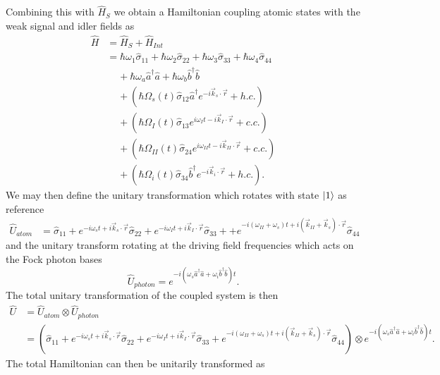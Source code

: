 \documentclass[aps,pra,showpacs,amsmath,amssymb,nofootinbib,longbibliography,superscriptaddress
]{revtex4-1}
\DeclarePairedDelimiter\ket{\lvert}{\rangle}
\theoremstyle{definition}
\theoremstyle{remark}
\newcommand{\0}{\hat{0}}
\begin{document}
Combining this with $\hat{H}_S$ we obtain a Hamiltonian coupling atomic states with the weak signal and idler fields as
\begin{align}
    \hat{H} &= \hat{H}_S + \hat{H}_{Int} \nonumber\\
    &= \hbar \omega_1 \hat{\sigma}_{11} + \hbar \omega_2 \hat{\sigma}_{22} + \hbar \omega_3 \hat{\sigma}_{33} + \hbar \omega_4 \hat{\sigma}_{44}\nonumber \\
    &\;\;\;\;+ \hbar \omega_{a} \hat{a}^{\dagger} \hat{a} + \hbar \omega_{b} \hat{b}^{\dagger} \hat{b}\nonumber \\
    &\;\;\;\;+ \left(\hbar \Omega_{s}(t) \hat{\sigma}_{12} \hat{a}^{\dagger} e^{-i \vec{k}_{s} \cdot \vec{r}} + h.c.\right)\nonumber \\
    &\;\;\;\;+ \left(\hbar \Omega_{I}(t) \hat{\sigma}_{13} e^{i \omega_I t - i \vec{k}_I \cdot \vec{r}} + c.c.\right)\nonumber \\
    &\;\;\;\;+ \left(\hbar \Omega_{II}(t) \hat{\sigma}_{24} e^{i \omega_{II} t - i \vec{k}_{II} \cdot \vec{r}} + c.c.\right)\nonumber \\
    &\;\;\;\;+ \left(\hbar \Omega_{i}(t) \hat{\sigma}_{34} \hat{b}^{\dagger} e^{-i \vec{k}_{i} \cdot \vec{r}} + h.c.\right).
\end{align}
We may then define the unitary transformation which rotates with state $\ket{1}$ as reference
\begin{align}
    \hat{U}_{atom} &=
    \hat{\sigma}_{11} +
    e^{-i \omega_s t + i \vec{k}_s \cdot \vec{r}} \hat{\sigma}_{22} +
    e^{-i \omega_I t + i \vec{k}_I \cdot \vec{r}} \hat{\sigma}_{33} +
    + e^{-i(\omega_{II} + \omega_s) t + i(\vec{k}_{II} + \vec{k}_s) \cdot \vec{r}} \hat{\sigma}_{44}
\end{align}
and the unitary transform rotating at the driving field frequencies which acts on the Fock photon bases
\begin{equation}
    \hat{U}_{photon} = e^{-i(\omega_s \hat{a}^{\dagger} \hat{a} + \omega_i \hat{b}^{\dagger} \hat{b})t}.
\end{equation}
The total unitary transformation of the coupled system is then
\begin{align}
    \hat{U} &= \hat{U}_{atom} \otimes \hat{U}_{photon} \nonumber \\
    &=
    \left(
        \hat{\sigma}_{11} +
        e^{-i \omega_s t + i \vec{k}_s \cdot \vec{r}} \hat{\sigma}_{22} +
        e^{-i \omega_I t + i \vec{k}_I \cdot \vec{r}} \hat{\sigma}_{33} +
        e^{-i(\omega_{II} + \omega_s) t + i(\vec{k}_{II} + \vec{k}_s) \cdot \vec{r}} \hat{\sigma}_{44}
    \right)
    \otimes e^{-i(\omega_s \hat{a}^{\dagger} \hat{a} + \omega_i \hat{b}^{\dagger} \hat{b})t}.
\end{align}
The total Hamiltonian can then be unitarily transformed as
\end{document}
